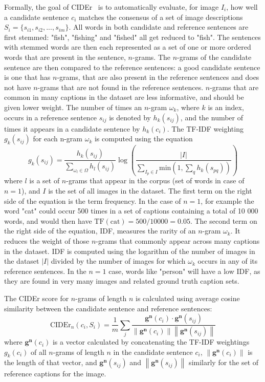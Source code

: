 \documentclass[english,twoside,openright]{HYgraduMLDS}
\newcommand{\vect}[1]{\bm{#1}}
\begin{document}
Formally, the goal of CIDEr~\cite{CIDEr} is to automatically evaluate, for image $I_i$, how well a candidate sentence $c_i$ matches the consensus of a set of image descriptions $S_i = \{s_{i1}, s_{i2}, \text{...}, s_{im}\}$. All words in both candidate and reference sentences are first stemmed: "fish", "fishing" and "fished" all get reduced to "fish". The sentences with stemmed words are then each represented as a set of one or more ordered words that are present in the sentence, $n$-grams. The $n$-grams of the candidate sentence are then compared to the reference sentences: a good candidate sentence is one that has $n$-grams, that are also present in the reference sentences and does not have $n$-grams that are not found in the reference sentences. $n$-grams that are common in many captions in the dataset are less informative, and should be given lower weight. The number of times an $n$-gram $\omega_k$, where $k$ is an index, occurs in a reference sentence $s_{ij}$ is denoted by $h_k(s_{ij})$, and the number of times it appears in a candidate sentence by $h_k(c_i)$. The TF-IDF weighting $g_k(s_{ij})$ for each n-gram $\omega_k$ is computed using the equation
\begin{equation}
g_k(s_{ij}) = \frac{h_k(s_{ij})}{\sum_{\omega_l \in \Omega} h_l(s_{ij})} \log \left( \frac{\lvert I \rvert}{\sum_{I_p \in I} \text{min}(1, \sum_q h_k(s_{pq}))} \right)
\end{equation}
%
where $l$ is a set of $n$-grams that appear in the corpus (set of words in case of $n=1$), and $I$ is the set of all images in the dataset. The first term on the right side of the equation is the term frequency. In the case of $n=1$, for example the word "cat" could occur 500 times in a set of captions containing a total of 10 000 words, and would then have $\text{TF}(\text{cat}) = 500 / 10 000 = 0.05$. The second term on the right side of the equation, IDF, measures the rarity of an $n$-gram $\omega_k$. It reduces the weight of those $n$-grams that commonly appear across many captions in the dataset. IDF is computed using the logarithm of
the number of images in the dataset $\lvert I \rvert$ divided by the number of images for which $\omega_k$ occurs in any of its reference sentences. In the $n=1$ case, words like "person" will have a low IDF, as they are found in very many images and related ground truth caption sets.

The CIDEr score for $n$-grams of length $n$ is calculated using average cosine similarity between the candidate sentence and reference sentences:
\begin{equation}
\text{CIDEr}_n(c_i, S_i) = \frac{1}{m} \sum_j \frac{\vect{g^n}(c_i) \cdot \vect{g^n}(s_{ij})}{\left\lVert \vect{g^n}(c_i) \right\rVert \left\lVert \vect{g^n}(s_{ij}) \right\rVert}
\end{equation}
%
where $\vect{g^n}(c_i)$ is a vector calculated by concatenating the TF-IDF weightings $g_k(c_i)$ of all $n$-grams of length $n$ in the candidate sentence $c_i$, $\left\lVert \vect{g^n}(c_i) \right\rVert$ is the length of that vector, and $\vect{g^n}(s_{ij})$ and $\left\lVert \vect{g^n}(s_{ij}) \right\rVert$ similarly for the set of reference captions for the image.
\end{document}
